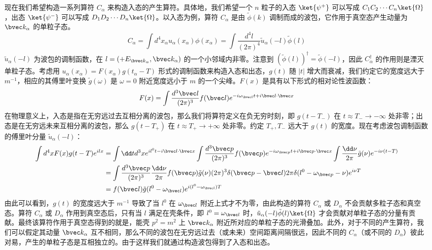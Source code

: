 现在我们希望构造一系列算符 $C_\alpha$ 来构造入态的产生算符。具体地，我们希望一个 $n$ 粒子的入态 $\ket{\psi^+}$ 可以写成 $C_1C_2\cdots C_n \ket{\Omega}$，出态 $\ket{\psi^-}$ 可以写成 $D_1D_2\cdots D_n \ket{\Omega}$。以入态为例，算符 $C_\alpha$ 是由 $\tilde \phi(k)$ 调制而成的波包，它作用于真空态产生动量为 $\bvec k_\alpha$ 的单粒子态。
\[
C_\alpha=\int d^4 {x_\alpha} u_\alpha(x_\alpha)\phi(x_\alpha) = \int \frac{d^4  l}{(2\pi)^4} \tilde{u}_\alpha(-l)\tilde\phi(l)
\]
$\tilde{u}_\alpha(-l)$ 为波包的调制函数，在 $l=(+E_{\bvec k_\alpha},\bvec k_\alpha)$ 的一个小邻域内非零。注意到 $(\tilde{\phi}(l))^\dagger=\tilde{\phi}(-l)$，因此 $C_\alpha^\dagger$ 的作用则是湮灭单粒子态。考虑用 $u_\alpha(x_\alpha)=F(x_\alpha)g(t_\alpha-T)$ 形式的调制函数来构造入态和出态，$g(t)$ 随 $|t|$ 增大而衰减，我们约定它的宽度远大于 $m^{-1}$，相应的其傅里叶变换 $\tilde g(\omega)$ 是 $\omega=0$ 附近宽度远小于 $m$ 的一个尖峰。$F(x)$ 是具有以下形式的相对论性波函数：
\[
F(x)=\int \frac{d^3 {\bvec l}}{(2\pi)^3} f(\bvec l) e^{-i\omega_{\bvec l}t+i\bvec l\cdot \bvec x}
\]
在物理意义上，入态是指在无穷远过去互相分离的波包，那么我们将算符定义在负无穷时刻，即 $g(t-T_-)$ 在 $t\approx T_-\rightarrow -\infty$ 处非零；出态是在无穷远未来互相分离的波包，那么 $g(t-T_+)$ 在 $t\approx T_+\rightarrow +\infty$ 处非零。约定 $T_+,T_-$ 远大于 $g(t)$ 的宽度。现在考虑波包调制函数的傅里叶分量 $\tilde{u}_\alpha(-l)$：
\begin{equation}\label{eq_LSZ_4}\begin{aligned}
\int d^4 {x}F(x)g(t-T)e^{ilx}&=\int \dd t d^3 {x} e^{il^0t - i\bvec l\cdot \bvec x}\int \frac{d^3 {\bvec p}}{(2\pi)^3}f(\bvec p)e^{-i\omega_{\bvec p}t+i\bvec p\cdot \bvec x}\int \frac{\dd \nu}{2\pi}\tilde g(\nu) e^{-i\nu(t-T)}\\
&=\int \frac{d^3 \bvec p}{(2\pi)^3}\frac{\dd \nu}{2\pi} f(\bvec p)\tilde g(\nu) (2\pi)^3 \delta(\bvec p-\bvec l) 2\pi \delta(l^0-\omega_{\bvec p}-\nu)e^{i\nu T}\\
&=f(\bvec l) \tilde g(l^0-\omega_{\bvec l})e^{i(l^0-\omega_{\bvec l})T}
\end{aligned}\end{equation}
由此可以看到，$g(t)$ 的宽度远大于 $m^{-1}$ 导致了当 $l^0$ 在 $\omega_{\bvec l}$ 附近上式才不为零，由此构造的算符 $C_\alpha$ 或 $D_\alpha$ 不会贡献多粒子态和真空态。算符 $C_\alpha$ 或 $D_\alpha$ 作用到真空态后，只有当 $l$ 满足在壳条件，即 $l^0=\omega_{\bvec l}$ 时，$\tilde{u}_\alpha(-l)\tilde \phi(l) \ket{\Omega}$ 才会贡献对单粒子态的分量有贡献。最终该算符作用于真空态得到的就是，能壳 $p^2=m^2$ 上 $\bvec k_\alpha$ 附近所对应的单粒子态的光滑叠加。此外，对于不同的产生算符，我们可以假定其动量 $\bvec k_\alpha$ 互不相同，那么不同的波包在无穷远过去（或未来）空间距离间隔很远，因此不同的 $C_\alpha$（或不同的 $D_\alpha$）彼此对易，产生的单粒子态是互相独立的。由于这样我们就通过构造波包得到了入态和出态。
